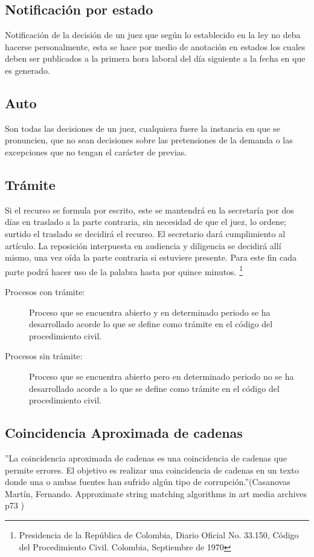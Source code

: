 \subsection{Notificaci\'on por estado} 
Notificaci\'on de la decisi\'on de un juez que seg\'un lo establecido en la 
ley no deba hacerse personalmente, esta se hace por medio de anotaci\'on 
en estados los cuales deben ser publicados a la primera hora laboral 
del d\'ia siguiente a la fecha en que es generado.

\subsection{Auto}
Son todas las decisiones de un juez, cualquiera fuere la instancia en 
que se pronuncien, que no sean decisiones sobre las pretensiones de
la demanda o las excepciones que no tengan el car\'acter de previas.

\subsection{Tr\'amite} Si el recurso se formula por escrito, este se mantendr\'a en la secretar\'ia por dos d\'ias en traslado a la parte contraria, sin necesidad de que el juez, lo ordene; surtido el traslado se decidir\'a el recurso. El secretario dar\'a cumplimiento al art\'iculo.
La reposici\'on interpuesta en audiencia y diligencia se decidir\'a all\'i mismo, una vez o\'ida la parte contraria si estuviere presente. Para este fin cada parte podr\'a hacer uso de la palabra hasta por quince minutos. \footnote{Presidencia de la Rep\'ublica de Colombia, Diario Oficial No. 33.150, C\'odigo del Procedimiento Civil.  Colombia, Septiembre de 1970}
\begin{description}
\item[Procesos con tr\'amite:] Proceso que se encuentra abierto y en 
determinado periodo se ha desarrollado acorde lo que  se define como 
tr\'amite en el c\'odigo del procedimiento civil.

\item[Procesos sin tr\'amite:] Proceso que se encuentra abierto pero en 
determinado periodo no se ha desarrollado acorde a lo que se define 
como tr\'amite en el c\'odigo del procedimiento civil.
\end{description}

\subsection{Coincidencia Aproximada de cadenas}  
''La coincidencia aproximada de cadenas es una coincidencia de cadenas 
que permite errores. El objetivo es realizar una coincidencia de 
cadenas en un texto donde una o ambas fuentes han sufrido alg\'un tipo 
de corrupci\'on.''(Casanovas Mart\'in, Fernando. Approximate string matching algorithms in art media archives p73 )

